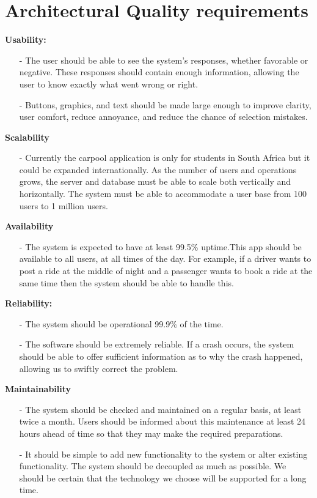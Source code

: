 \documentclass[hidelinks, 12pt, a4paper]{article}
\begin{document}
\section{Architectural Quality requirements}
\large{\textbf{Usability:}}
\begin{itemize}[]
            \item [-]The user should be able to see the system's responses, whether favorable or negative. These responses should contain enough information, allowing the user to know exactly what went wrong or right.
            \item [-]Buttons, graphics, and text should be made large enough to improve clarity, user comfort, reduce annoyance, and reduce the chance of selection mistakes.
        \end{itemize}
\vspace{0.5cm}
\large{ \textbf{Scalability}}
\begin{itemize}
      \item[-]Currently the carpool application is only for students in South Africa but it could be expanded internationally. As the number of users and operations grows, the server and database must be able to scale both vertically and horizontally.  The system must be able to accommodate a user base from 100 users to 1 million users.
\end{itemize}
\vspace{0.5cm}
\large{ \textbf{Availability}}
\begin{itemize}
      \item[-] The system is expected to have at least 99.5\% uptime.This app should be available to all users, at all times of the day. For example, if a driver wants to post a ride at the middle of night and a passenger wants to book a ride at the same time then the system should be able to handle this.
\end{itemize}
\vspace{0.5cm}
\large{ \textbf{Reliability:}}
\begin{itemize}
        \item[-] The system should be operational 99.9\% of the time.
      \item[-] The software should be extremely reliable. If a crash occurs, the system should be able to offer sufficient information as to why the crash happened, allowing us to swiftly correct the problem.
\end{itemize}
\newpage
\large{ \textbf{Maintainability}}
\begin{itemize}
      \item[-] The system should be checked and maintained on a regular basis, at least twice a month. Users should be informed about this maintenance at least 24 hours ahead of time so that they may make the required preparations.
      \item [-] It should be simple to add new functionality to the system or alter existing functionality. The system should be decoupled as much as possible. We should be certain that the technology we choose will be supported for a long time.
      \end{itemize}
\end{document}
